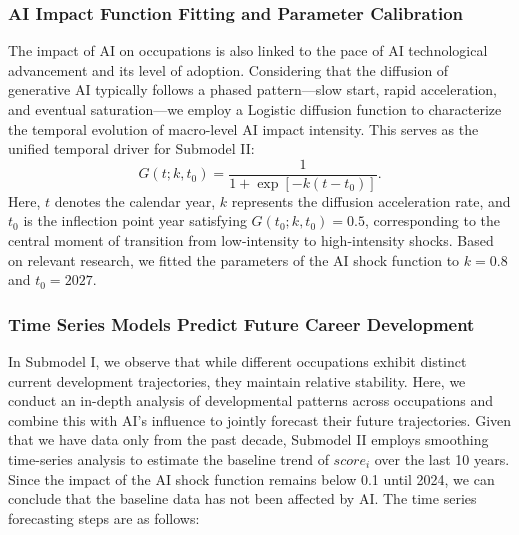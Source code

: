 \documentclass{mcmthesis}
\begin{document}
\subsubsection{AI Impact Function Fitting and Parameter Calibration}

The impact of AI on occupations is also linked to the pace of AI technological advancement and its level of adoption. Considering that the diffusion of generative AI typically follows a phased pattern—slow start, rapid acceleration, and eventual saturation—we employ a Logistic diffusion function to characterize the temporal evolution of macro-level AI impact intensity. This serves as the unified temporal driver for Submodel II:
\begin{equation}
G(t;k,t_0)=\frac{1}{1+\exp\!\left[-k\left(t-t_0\right)\right]}.
\label{eq:logistic_shock}
\end{equation}
Here, $t$ denotes the calendar year, $k$ represents the diffusion acceleration rate, and $t_0$ is the inflection point year satisfying $G(t_0;k,t_0)=0.5$, corresponding to the central moment of transition from low-intensity to high-intensity shocks. Based on relevant research\cite{METR2025ForecastAI}, we fitted the parameters of the AI shock function to $k=0.8$ and $t_0=2027$.

\subsubsection{Time Series Models Predict Future Career Development}

In Submodel I, we observe that while different occupations exhibit distinct current development trajectories, they maintain relative stability. Here, we conduct an in-depth analysis of developmental patterns across occupations and combine this with AI's influence to jointly forecast their future trajectories. Given that we have data only from the past decade, Submodel II employs smoothing time-series analysis to estimate the baseline trend of $score_i$ over the last 10 years. Since the impact of the AI shock function remains below 0.1 until 2024, we can conclude that the baseline data has not been affected by AI. The time series forecasting steps are as follows:
\end{document}
